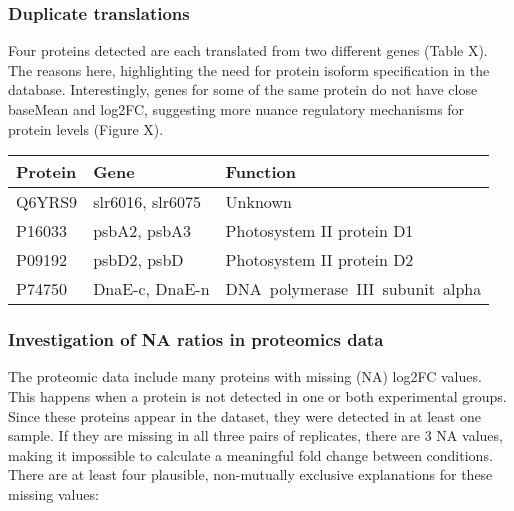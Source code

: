 \subsubsection{Duplicate translations}\label{duplicate-translations}

Four proteins detected are each translated from two different genes
(Table X). The reasons here, highlighting the need for protein isoform
specification in the database. Interestingly, genes for some of the same
protein do not have close baseMean and log2FC, suggesting more nuance
regulatory mechanisms for protein levels (Figure X).

\begin{longtable}[]{@{}lll@{}}
\toprule\noalign{}
Protein & Gene & Function \\
\midrule\noalign{}
\endhead
\bottomrule\noalign{}
\endlastfoot
Q6YRS9 & slr6016, slr6075 & Unknown \\
P16033 & psbA2, psbA3 & Photosystem II protein D1 \\
P09192 & psbD2, psbD & Photosystem II protein D2 \\
P74750 & DnaE-c, DnaE-n & DNA~polymerase~III~subunit~alpha \\
\end{longtable}

\subsubsection{Investigation of NA ratios in proteomics
data}\label{investigation-of-na-ratios-in-proteomics-data}

The proteomic data include many proteins with missing (NA) log2FC
values. This happens when a protein is not detected in one or both
experimental groups. Since these proteins appear in the dataset, they
were detected in at least one sample. If they are missing in all three
pairs of replicates, there are 3 NA values, making it impossible to
calculate a meaningful fold change between conditions. There are at
least four plausible, non-mutually exclusive explanations for these
missing values:

